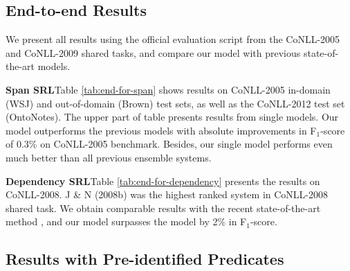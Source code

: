 \documentclass[letterpaper]{article} %
\begin{document}

\subsection{End-to-end Results}
We present all results using the official evaluation script from the CoNLL-2005 and CoNLL-2009 shared tasks, and compare our model with previous state-of-the-art models.
 
\noindent \textbf{Span SRL}\quad Table \ref{tab:end-for-span} shows results on CoNLL-2005 in-domain (WSJ) and out-of-domain (Brown) test sets, as well as the CoNLL-2012 test set (OntoNotes). The upper part of table presents results from single models. Our model outperforms the previous models with absolute improvements in F$_1$-score of 0.3\% on CoNLL-2005 benchmark. Besides, our single model performs even much better than all previous ensemble systems.

\noindent \textbf{Dependency SRL}\quad Table \ref{tab:end-for-dependency} presents the results on CoNLL-2008. J \& N (2008b) \cite{Johansson2008Dependency} was the highest ranked system in CoNLL-2008 shared task. We obtain comparable results with the recent state-of-the-art method \cite{cai2018full}, and our model surpasses the model \cite{he:2018Syntax} by 2\% in F$_1$-score. 


\subsection{Results with Pre-identified Predicates}
\end{document}
